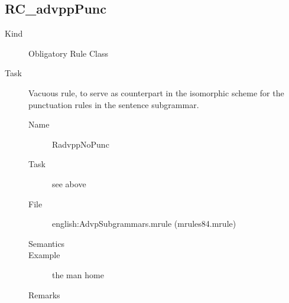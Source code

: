\begin{description}
\begin{description}
\end{description}

\newpage
\subsection{RC\_advppPunc}
\begin{description}
\item[Kind] Obligatory Rule Class
\item[Task] Vacuous rule, to serve as counterpart in the isomorphic scheme for 
the punctuation rules in the sentence subgrammar. 

\vspace{1 cm}
\begin{description}
\item[Name] RadvppNoPunc
\item[Task] see above
\item[File] english:AdvpSubgrammars.mrule (mrules84.mrule)
\item[Semantics] 
\item[Example] the man home
\item[Remarks]
\end{description}

\end{description}




